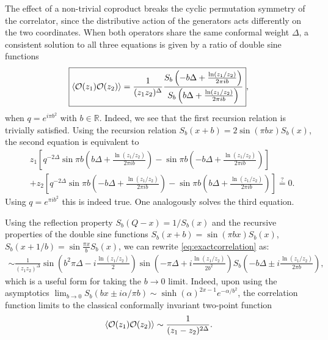 \documentclass[a4paper,titlepage,12pt]{article}
\numberwithin{equation}{section}
\begin{document}
The effect of a non-trivial coproduct breaks the cyclic permutation symmetry of the correlator, since the distributive action of the generators acts differently on the two coordinates. When both operators share the same conformal weight $\Delta$, a  consistent solution to all three equations is given by a ratio of double sine functions 
\begin{align}
\label{eq:exactcorrelation}
    \boxed{\braket{\mathcal{O}(z_1)\mathcal{O}(z_2)}=\frac{1}{(z_1z_2)^\Delta}\frac{S_b\left(-b\Delta+\frac{\ln(z_1/z_2)}{2\pi ib}\right)}{S_b\left(b\Delta+\frac{\ln(z_1/z_2)}{2\pi ib}\right)}},
\end{align}
when $q=e^{i\pi b^2}$ with $b\in \mathbb{R}$. Indeed, we see that the first recursion relation is trivially satisfied. Using the recursion relation $S_b(x+b)=2\sin(\pi bx) S_b(x)$, the second equation is equivalent to 
\begin{align}
&z_1\left[q^{-2\Delta}\sin\pi b\left(b\Delta+\frac{\ln(z_1/z_2)}{2\pi ib}\right)-\sin\pi b\left(-b\Delta+\frac{\ln(z_1/z_2)}{2\pi ib}\right)\right]\\&+z_2\left[q^{-2\Delta}\sin\pi b\left(-b\Delta+\frac{\ln(z_1/z_2)}{2\pi ib}\right)-\sin\pi b\left(b\Delta+\frac{\ln(z_1/z_2)}{2\pi ib}\right)\right] \overset{?}{=} 0.
\end{align}
Using $q=e^{\pi ib^2}$ this is indeed true. One analogously solves the third equation.

Using the reflection property $S_b(Q-x)=1/S_b(x)$ and the recursive properties of the double sine functions $S_b(x+b)=\sin(\pi bx)S_b(x)$, $S_b(x+1/b)=\sin\frac{\pi x}{b}S_b(x)$, we can rewrite \eqref{eq:exactcorrelation} as:
\begin{align}
    \sim \frac{1}{(z_1z_2)^\Delta}\sin\left(b^2\pi\Delta-i\frac{\ln(z_1/z_2)}{2 }\right)\sin\left(-\pi \Delta +i\frac{\ln(z_1/z_2)}{2 b^2}\right)S_b\left(-b\Delta\pm i\frac{\ln(z_1/z_2)}{2\pi b}\right),
\end{align}
which is a useful form for taking the $b\to 0$ limit. Indeed, upon using the asymptotics $\lim_{b\rightarrow0}S_b(bx\pm i\alpha/\pi b)\sim \sinh(\alpha)^{2x-1}e^{-\alpha/b^2}$, the correlation function limits to the classical conformally invariant two-point function
\begin{align}
    \braket{\mathcal{O}(z_1)\mathcal{O}(z_2)}\sim \frac{1}{(z_1-z_2)^{2\Delta}}.
\end{align}
\end{document}
